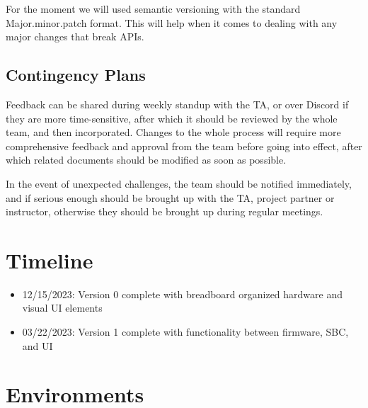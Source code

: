 For the moment we will used semantic versioning with the standard
Major.minor.patch format. This will help when it comes to dealing with
any major changes that break APIs.

\hypertarget{contingency-plans}{%
\subsection{Contingency Plans}\label{contingency-plans}}

Feedback can be shared during weekly standup with the TA, or over
Discord if they are more time-sensitive, after which it should be
reviewed by the whole team, and then incorporated. Changes to the whole
process will require more comprehensive feedback and approval from the
team before going into effect, after which related documents should be
modified as soon as possible.

In the event of unexpected challenges, the team should be notified
immediately, and if serious enough should be brought up with the TA,
project partner or instructor, otherwise they should be brought up
during regular meetings.

\hypertarget{timeline}{%
\section{Timeline}\label{timeline}}

\begin{itemize}
\tightlist
\item
  12/15/2023: Version 0 complete with breadboard organized hardware and
  visual UI elements
\item
  03/22/2023: Version 1 complete with functionality between firmware,
  SBC, and UI
\end{itemize}

\hypertarget{environments}{%
\section{Environments}\label{environments}}

